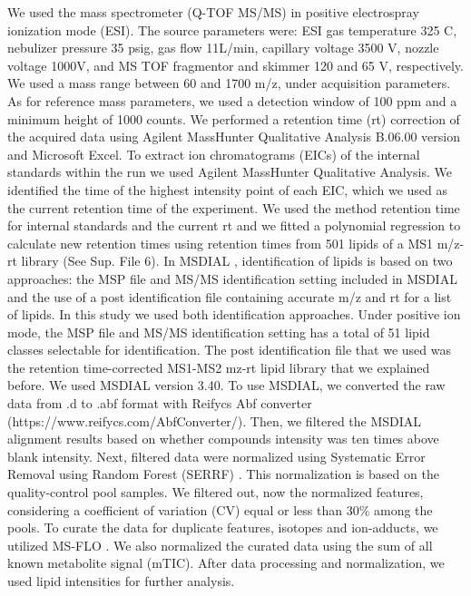 \documentclass[9pt,twocolumn,twoside,lineno]{BioRxiv}
\begin{document}
We used the mass spectrometer (Q-TOF MS/MS) in positive electrospray ionization mode (ESI).
The source parameters were: ESI gas temperature 325 \degree C, nebulizer pressure 35 psig, gas flow 11L/min, capillary voltage 3500 V, nozzle voltage 1000V, and MS TOF fragmentor and skimmer 120 and 65 V, respectively.
We used a mass range between 60 and 1700 m/z, under acquisition parameters. 
As for reference mass parameters, we used a detection window of 100 ppm and a minimum height of 1000 counts. 
We performed a retention time (rt) correction of the acquired data using Agilent MassHunter Qualitative Analysis B.06.00 version and Microsoft Excel. 
To extract ion chromatograms (EICs) of the internal standards within the run we used Agilent MassHunter Qualitative Analysis.
We identified the time of the highest intensity point of each EIC, which we used as the current retention time of the experiment. 
We used the method retention time for internal standards and the current rt and we fitted a polynomial regression to calculate new retention times using retention times from 501 lipids of a MS1 m/z-rt library (See Sup. File 6). 
In MSDIAL \cite{Tsugawa2015-kh}, identification of lipids is based on two approaches: the MSP file and MS/MS identification setting included in MSDIAL and the use of a post identification file containing accurate m/z and rt for a list of lipids. 
In this study we used both identification approaches. 
Under positive ion mode, the MSP file and MS/MS identification setting has a total of 51 lipid classes  selectable for identification. 
The post identification file that we used was the retention time-corrected MS1-MS2 mz-rt lipid library that we explained before. 
We used MSDIAL \cite{Tsugawa2015-kh} version 3.40. 
To use MSDIAL, we converted the raw data from .d to .abf format with Reifycs Abf converter (https://www.reifycs.com/AbfConverter/). 
Then, we filtered the MSDIAL alignment results based on whether compounds intensity was ten times above blank intensity. Next, filtered data were normalized using Systematic Error Removal using Random Forest (SERRF) \cite{Fan2019}. This normalization is based on the quality-control pool samples. 
We filtered out, now the normalized features, considering a coefficient of variation (CV) equal or less than 30\% among the pools. 
To curate the data for duplicate features, isotopes and ion-adducts, we utilized MS-FLO \cite{DeFelice2017-ms}.
We also normalized the curated data using the sum of all known metabolite signal (mTIC). 
After data processing and normalization, we used lipid intensities for further analysis.
\end{document}
